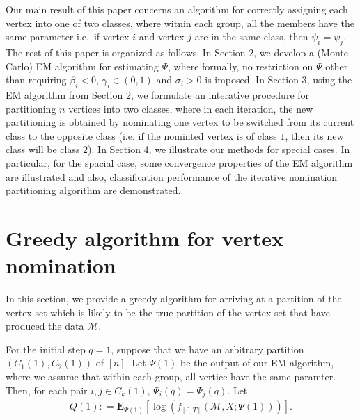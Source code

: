 \documentclass[12pt]{article}%
\begin{document}
Our main result of this paper concerns an algorithm for correctly assigning each vertex into one of two classes, where witnin each group, all the members  
have the same parameter i.e.\ if vertex $i$ and vertex $j$ are in the same
class, then $\psi_i = \psi_j$.  The rest of this paper is organized as follows.
In Section 2, we develop a (Monte-Carlo) EM algorithm for estimating 
$\Psi$, where formally, no restriction on $\Psi$
other than requiring $\beta_i < 0$, $\gamma_i \in (0,1)$ and $\sigma_i > 0$ is imposed. 
In Section 3, using the EM algorithm from Section 2, we formulate an interative 
procedure for partitioning $n$ vertices into two classes, where in each iteration, the new partitioning is obtained by nominating one vertex to be switched from its current class to the opposite class (i.e. if the nominted vertex is of class $1$, then its new class will be class $2$).  In Section 4, we illustrate our methods for special cases.  In particular, for the spacial case, some convergence properties of the EM algorithm are illustrated and also, classification performance of the iterative nomination partitioning algorithm are demonstrated.  



\section{Greedy algorithm for vertex nomination}
In this section, we provide a greedy algorithm for arriving at a partition 
of the vertex set which is likely to be the true partition of 
the vertex set that  have produced the data $\mathcal M$.

For the initial step $q=1$, suppose that we have 
an arbitrary partition $(C_1(1), C_2(1))$ of $[n]$. 
Let $\Psi(1)$ be the output of our EM algorithm, where we assume that within each group,
all vertice have the same paramter.  Then, for each pair $i, j \in C_k(1)$, $\Psi_i(q) = \Psi_j(q)$.  
Let
\begin{eqnarray}
Q(1) : = \mathbf E_{\Psi(1)}\left[\log(f_{[0,T]}(\mathcal M, X;\Psi(1)))\right].
\end{eqnarray}
\end{document}

